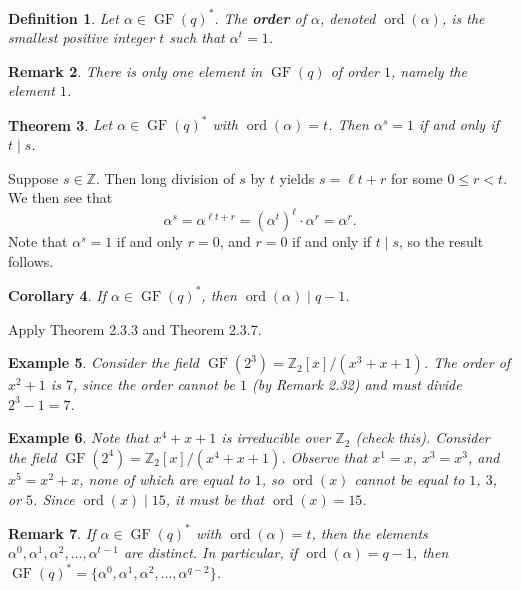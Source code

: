 \documentclass[10pt]{article}
\makeatletter
\newcommand{\Z}{\mathbb{Z}}
\DeclareMathOperator{\ord}{ord}
\DeclareMathOperator{\GF}{GF}
\theoremstyle{newstyle}
\newtheorem{thm}{Theorem}[subsection]
\newtheorem{cor}[thm]{Corollary}
\newtheorem{remark}[thm]{Remark}
\newtheorem{defn}[thm]{Definition}
\newtheorem{exmp}[thm]{Example}
\newenvironment{pf}[1][\proofname]{\par
  \pushQED{\qed}%
  \normalfont \topsep0\p@\relax
  \trivlist
  \item[\hskip\labelsep\scshape
  #1\@addpunct{.}]\ignorespaces
}{%
  \popQED\endtrivlist\@endpefalse
}
\makeatother
\begin{document}
\begin{defn}
Let $\alpha \in \GF(q)^*$. The {\bf order} of $\alpha$, denoted $\ord(\alpha)$, is the 
smallest positive integer $t$ such that $\alpha^t = 1$. 
\end{defn}

\begin{remark}
There is only one element in $\GF(q)$ of order $1$, namely the element $1$.
\end{remark}

\begin{thm}
Let $\alpha \in \GF(q)^*$ with $\ord(\alpha) = t$. Then $\alpha^s = 1$ if and only if $t \mid s$.
\end{thm}
\begin{pf}
Suppose $s \in \Z$. Then long division of $s$ by $t$ yields $s = \ell t + r$ for some $0 \leq r < t$. 
We then see that 
\[ \alpha^s = \alpha^{\ell t + r} = (\alpha^t)^\ell \cdot \alpha^r = \alpha^r. \]
Note that $\alpha^s = 1$ if and only $r = 0$, and $r = 0$ if and only if $t \mid s$, so the result 
follows.
\end{pf}

\begin{cor}
If $\alpha \in \GF(q)^*$, then $\ord(\alpha) \mid q-1$. 
\end{cor}
\begin{pf}
Apply Theorem 2.3.3 and Theorem 2.3.7.
\end{pf}

\begin{exmp}
Consider the field $\GF(2^3) = \Z_2[x]/(x^3 + x + 1)$. The order of $x^2 + 1$ is $7$, 
since the order cannot be $1$ (by Remark 2.32) and must divide $2^3 - 1 = 7$. 
\end{exmp}

\begin{exmp}
Note that $x^4 + x + 1$ is irreducible over $\Z_2$ (check this). Consider the field 
$\GF(2^4) = \Z_2[x]/(x^4 + x + 1)$. Observe that $x^1 = x$, $x^3 = x^3$, and 
$x^5 = x^2 + x$, none of which are equal to $1$, so $\ord(x)$ cannot be equal to $1$, $3$, or $5$. 
Since $\ord(x) \mid 15$, it must be that $\ord(x) = 15$. 
\end{exmp}

\begin{remark}
If $\alpha \in \GF(q)^*$ with $\ord(\alpha) = t$, then the elements 
$\alpha^0, \alpha^1, \alpha^2, \dots, \alpha^{t-1}$ are distinct. In particular, if 
$\ord(\alpha) = q-1$, then $\GF(q)^* = \{\alpha^0, \alpha^1, \alpha^2, \dots, \alpha^{q-2}\}$.
\end{remark}
\end{document}
